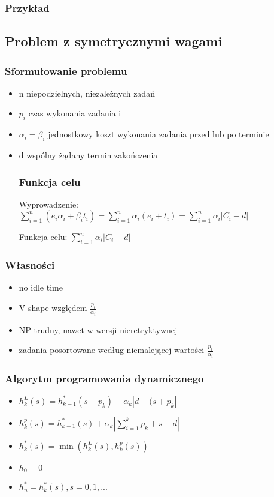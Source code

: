 \documentclass[12pt,a4paper]{article}
\begin{document}
\subsubsection{Przykład}
\subsection{Problem z symetrycznymi wagami}
\subsubsection{Sformułowanie problemu}
\begin{itemize}
\item n niepodzielnych, niezależnych zadań
\item $p_{i}$ czas wykonania zadania i
\item $\alpha_{i} =\beta_{i}$ jednostkowy koszt wykonania zadania przed lub po terminie
\item d wspólny żądany termin zakończenia
\subsubsection{Funkcja celu}
Wyprowadzenie: $\sum\limits_{i=1}^{n}(e_{i}\alpha_{i}+\beta_{i}t_{i}) = \sum\limits_{i=1}^{n}\alpha_{i}(e_{i}+t_{i}) = \sum\limits_{i=1}^{n}\alpha_{i}\left | C_{i} - d \right |$

Funkcja celu: $\sum\limits_{i=1}^{n}\alpha_{i}\left | C_{i} - d \right |$
\end{itemize}
\subsubsection{Własności}
\begin{itemize}
\item no idle time
\item V-shape względem $\frac{p_{i}}{\alpha_{i}}$
\item NP-trudny, nawet w wersji nieretryktywnej
\item zadania posortowane według niemalejącej wartości $\frac{p_{i}}{\alpha_{i}}$
\end{itemize}
\subsubsection{Algorytm programowania dynamicznego}
\begin{itemize}
\item $h_{k}^{L}(s) = h_{k-1}^{*}(s+p_{k}) + \alpha_{k} \left | d-(s+p_{k} \right |$
\item $h_{k}^{p}(s) = h_{k-1}^{*}(s) + \alpha_{k} \left | \sum\limits_{i=1}^{k} p_{k}+s-d \right |$
\item $h_{k}^{*}(s)=\min(h_{k}^{L}(s), h_{k}^{p}(s))$
\item $h_{0}=0$
\item $h_{n}^{*} = {h_{k}^{*}(s), s=0,1,...}$
\end{itemize}
\end{document}
